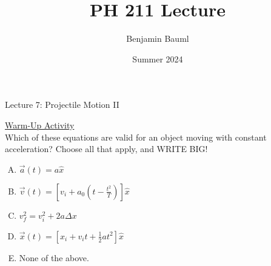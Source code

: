 \documentclass[]{article}
\title{PH 211 Lecture \Week}
\author{Benjamin Bauml}
\date{Summer 2024}
\begin{document}
\begin{TeacherMargin}

\end{TeacherMargin}
\begin{PresentSpace}
\begin{center}
	\huge Lecture 7: Projectile Motion II
\end{center}
\vspace{0.5cm}
\underline{Warm-Up Activity} \\
Which of these equations are valid for an object moving with constant acceleration? Choose all that apply, and WRITE BIG!
\begin{enumerate}[(A)]
	\item $\vec{a}(t)=a\hat{x}$
	\item $\vec{v}(t) = \left[v_{i}+a_{0}\left(t-\frac{t^{2}}{T}\right)\right]\hat{x}$
	\item $v_{f}^{2}=v_{i}^{2}+2a\Delta x$
	\item $\vec{x}(t) = \left[x_{i}+v_{i}t+\frac{1}{2}at^{2}\right]\hat{x}$
	\item None of the above.
\end{enumerate}
\end{PresentSpace}
\newpage
\begin{TeacherMargin}

\end{TeacherMargin}
\end{document}
